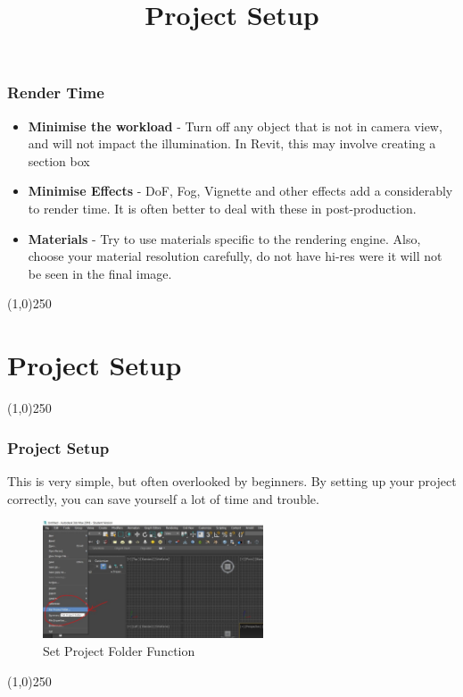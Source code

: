 \begin{frame}
\frametitle{Render Time}
\begin{itemize}
	\item \textbf{Minimise the workload} - Turn off any object that is not in camera view, and will not impact the illumination.  In Revit, this may involve creating a section box
	\item \textbf{Minimise Effects} - DoF, Fog, Vignette and other effects add a considerably to render time.  It is often better to deal with these in post-production.
	\item \textbf{Materials} - Try to use materials specific to the rendering engine.  Also, choose your material resolution carefully, do not have hi-res were it will not be seen in the final image.
\end{itemize}

\end{frame}
\begin{center}\line(1,0){250}\end{center}







\section{Project Setup}
\begin{frame}
\title[Project Setup]{Project Setup}
\titlepage
\end{frame}\begin{center}\line(1,0){250}\end{center}



\begin{frame}
\frametitle{Project Setup}
This is very simple, but often overlooked by beginners.  By setting up your project correctly, you can save yourself a lot of time and trouble.
\begin{figure}
	\centering
	\includegraphics[height=3.5cm]{img/setProject}
	\caption[Set Project Folder Function]{Set Project Folder Function}
	\label{fig:setproject}
\end{figure}
\end{frame}
\begin{center}\line(1,0){250}\end{center}


